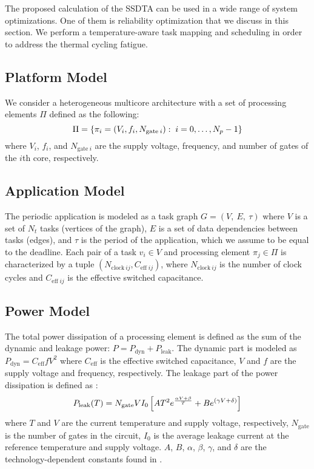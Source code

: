 The proposed calculation of the SSDTA can be used in a wide range of system
optimizations. One of them is reliability optimization that we discuss in this
section. We perform a temperature-aware task mapping and scheduling in order to
address the thermal cycling fatigue.

\subsection{Platform Model}

We consider a heterogeneous multicore architecture with a set of processing
elements $\Pi$ defined as the following:
\[
  \Pi = \{ \pi_i = (V_i, f_i, N_{\text{gate} \: i}): \; i = 0, \dots, N_p - 1 \}
\]
where $V_i$, $f_i$, and $N_{\text{gate} \: i}$ are the supply voltage,
frequency, and number of gates \cite{liao2005} of the $i$th core, respectively.

\subsection{Application Model}

The periodic application is modeled as a task graph $G = (V, \: E, \: \tau)$
where $V$ is a set of $N_t$ tasks (vertices of the graph), $E$ is a set of data
dependencies between tasks (edges), and $\tau$ is the period of the application,
which we assume to be equal to the deadline. Each pair of a task $v_i \in V$ and
processing element $\pi_j \in \Pi$ is characterized by a tuple $(N_{\text{clock}
\: ij}, C_{\text{eff} \; ij})$, where $N_{\text{clock} \: ij}$ is the number of
clock cycles and $C_{\text{eff} \; ij}$ is the effective switched capacitance.

\subsection{Power Model}

The total power dissipation of a processing element is defined as the sum of the
dynamic and leakage power: $P = P_\text{dyn} + P_\text{leak}$. The dynamic part
is modeled as $P_\text{dyn} = C_\text{eff} f V^2$ where $C_\text{eff}$ is the
effective switched capacitance, $V$ and $f$ are the supply voltage and
frequency, respectively. The leakage part of the power dissipation is defined as
\cite{liao2005}:
\begin{equation} \elab{total-power}
  P_\text{leak}(T) = N_\text{gate} V I_0 \left[ A T^2 e^{\frac{\alpha V + \beta}{T}} + B e^{(\gamma V + \delta)} \right]
\end{equation}
where $T$ and $V$ are the current temperature and supply voltage, respectively,
$N_\text{gate}$ is the number of gates in the circuit, $I_0$ is the average
leakage current at the reference temperature and supply voltage. $A$, $B$,
$\alpha$, $\beta$, $\gamma$, and $\delta$ are the technology-dependent constants
found in \cite{liao2005}.

